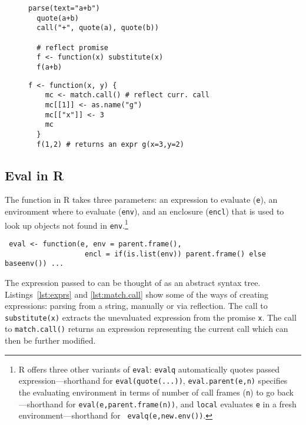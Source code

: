 \documentclass[acmsmall, screen]{acmart}
\renewcommand{\k}[1]{\lstinline |#1|\xspace}
\begin{document}
\begin{figure}[!t]
\begin{minipage}{.49\textwidth}
\begin{lstlisting}[caption={Examples of calls producing expression \k{a+b}},label=lst:exprs]
  parse(text="a+b")
  quote(a+b)
  call("+", quote(a), quote(b))

  # reflect promise
  f <- function(x) substitute(x)
  f(a+b)
  \end{lstlisting}
\end{minipage}
\begin{minipage}{.49\textwidth}
  \begin{lstlisting}[caption={Example of a call reflection},label=lst:match.call]
  f <- function(x, y) {
    mc <- match.call() # reflect curr. call
    mc[[1]] <- as.name("g")
    mc[["x"]] <- 3
    mc
  }
  f(1,2) # returns an expr g(x=3,y=2)
  \end{lstlisting}
\end{minipage}
\end{figure}

\subsection{Eval in R}\label{sec:eval-in-r}

The \eval function in R takes three parameters: an expression to evaluate
(\k{e}), an environment where to evaluate (\k{env}), and an enclosure (\k{encl})
that is used to look up objects not found in \k{env}.\footnote{R offers three
other variants of {\tt eval}: {\tt evalq} automatically quotes passed
expression---shorthand for {\tt eval(quote(...))}, {\tt eval.parent(e,n)}
specifies the evaluating environment in terms of number of call frames ({\tt n})
to go back---shorthand for {\tt eval(e,parent.frame(n))}, and {\tt local}
evaluates {\tt e} in a fresh environment---shorthand for {\tt
  evalq(e,new.env())}.}

\begin{lstlisting}
 eval <- function(e, env = parent.frame(),
                   encl = if(is.list(env)) parent.frame() else baseenv()) ...
\end{lstlisting}

The expression passed to \eval can be thought of as an abstract syntax tree.
Listings~\ref{lst:exprs} and \ref{lst:match.call} show some of the ways of
creating expressions: parsing from a string, manually or via reflection. The
call to \k{substitute(x)} extracts the unevaluated expression from the promise
\k{x}. The call to \k{match.call()} returns an expression representing the
current call which can then be further modified.
\end{document}
